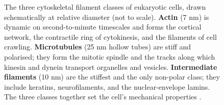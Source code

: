 \begin{figure}[htbp]
\caption[Three cytoskeletal filament classes]{The three cytoskeletal
filament classes of eukaryotic cells, drawn schematically at relative
diameter (not to scale). \textbf{Actin} (7 nm) is dynamic on
second-to-minute timescales and forms the cortical network, the
contractile ring of cytokinesis, and the filaments of cell crawling.
\textbf{Microtubules} (25 nm hollow tubes) are stiff and polarised;
they form the mitotic spindle and the tracks along which kinesin and
dynein transport organelles and vesicles. \textbf{Intermediate
filaments} (10 nm) are the stiffest and the only non-polar class;
they include keratins, neurofilaments, and the nuclear-envelope
lamins. The three classes together set the cell's mechanical
properties \cite[ch.~16]{text:v6c01-alberts-mbc-2022}.}
\label{fig:vol06:ch01:cytoskeleton}
\end{figure}
